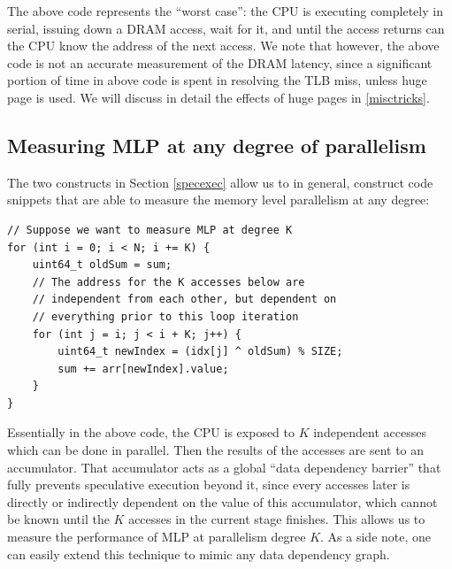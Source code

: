 \documentclass[11pt, usletter]{article}
\begin{document}
The above code represents the ``worst case'': the CPU is executing completely in serial,
issuing down a DRAM access, wait for it, and until the access returns can the CPU know the address of the next access.
We note that however, the above code is not an accurate measurement of the DRAM latency, 
since a significant portion of time in above code is spent in resolving the TLB miss, unless huge page is used.
We will discuss in detail the effects of huge pages in \ref{misctricks}.

\subsection{Measuring MLP at any degree of parallelism} \label{mlpmeasurement}

The two constructs in Section \ref{specexec} allow us to in general, construct code snippets that are able to measure 
the memory level parallelism at any degree:

\singlespacing\begin{codebox}
\begin{verbatim}
// Suppose we want to measure MLP at degree K
for (int i = 0; i < N; i += K) {
    uint64_t oldSum = sum;
    // The address for the K accesses below are 
    // independent from each other, but dependent on 
    // everything prior to this loop iteration
    for (int j = i; j < i + K; j++) {
        uint64_t newIndex = (idx[j] ^ oldSum) % SIZE;
        sum += arr[newIndex].value;
    }
}
\end{verbatim}
\end{codebox}\doublespacing

Essentially in the above code, the CPU is exposed to $K$ independent accesses which can be done in parallel. 
Then the results of the accesses are sent to an accumulator.
That accumulator acts as a global ``data dependency barrier'' that fully prevents speculative execution beyond it, 
since every accesses later is directly or indirectly dependent on the value of this accumulator, 
which cannot be known until the $K$ accesses in the current stage finishes.
This allows us to measure the performance of MLP at parallelism degree $K$. 
As a side note, one can easily extend this technique to mimic any data dependency graph.

\end{document}
